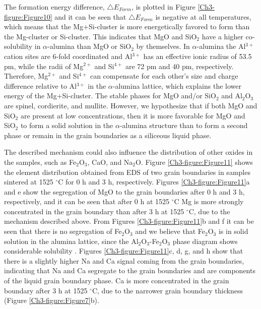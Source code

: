 \noindent The formation energy difference, $\bigtriangleup E_{Form}$, is plotted in Figure \ref{Ch3-figure:Figure10} and it can be seen that $\bigtriangleup E_{Form}$ is negative at all temperatures, which means that the Mg+Si-cluster is more energetically favored to form than the Mg-cluster or Si-cluster. This indicates that MgO and SiO$_{2}$ have a higher co-solubility in $\alpha$-alumina than MgO or SiO$_{2}$ by themselves. In $\alpha$-alumina the Al$^{3+}$ cation sites are 6-fold coordinated and Al$^{3+}$ has an effective ionic radius of 53.5 pm, while the radii of Mg$^{2+}$ and Si$^{4+}$ are 72 pm and 40 pm, respectively. Therefore, Mg$^{2+}$ and Si$^{4+}$ can compensate for each other's size and charge difference relative to Al$^{3+}$ in the $\alpha$-alumina lattice, which explains the lower energy of the Mg+Si-cluster. The stable phases for MgO and/or SiO$_{2}$ and Al$_{2}$O$_{3}$ are spinel, cordierite, and mullite. However, we hypothesize that if both MgO and SiO$_{2}$ are present at low concentrations, then it is more favorable for MgO and SiO$_{2}$ to form a solid solution in the $\alpha$-alumina structure than to form a second phase or remain in the grain boundaries as a siliceous liquid phase. 

The described mechanism could also influence the distribution of other oxides in the samples, such as Fe$_{2}$O$_{3}$, CaO, and Na$_{2}$O. Figure \ref{Ch3-figure:Figure11} shows the element distribution obtained from EDS of two grain boundaries in samples sintered at 1525 $^{\circ}$C for 0 h and 3 h, respectively. Figures \ref{Ch3-figure:Figure11}a and e show the segregation of MgO to the grain boundaries after 0 h and 3 h, respectively, and it can be seen that after 0 h at 1525 $^{\circ}$C Mg is more strongly concentrated in the grain boundary than after 3 h at 1525 $^{\circ}$C, due to the mechanism described above. From Figures \ref{Ch3-figure:Figure11}b and f it can be seen that there is no segregation of Fe$_{2}$O$_{3}$ and we believe that Fe$_{2}$O$_{3}$ is in solid solution in the alumina lattice, \cite{Atkinson2003} since the Al$_{2}$O$_{3}$-Fe$_{2}$O$_{3}$ phase diagram shows considerable solubility \cite{Raghavan2010}. Figures \ref{Ch3-figure:Figure11}c, d, g, and h show that there is a slightly higher Na and Ca signal coming from the grain boundaries, indicating that Na and Ca segregate to the grain boundaries and are components of the liquid grain boundary phase. Ca is more concentrated in the grain boundary after 3 h at 1525 $^{\circ}$C, due to the narrower grain boundary thickness (Figure \ref{Ch3-figure:Figure7}b). 

